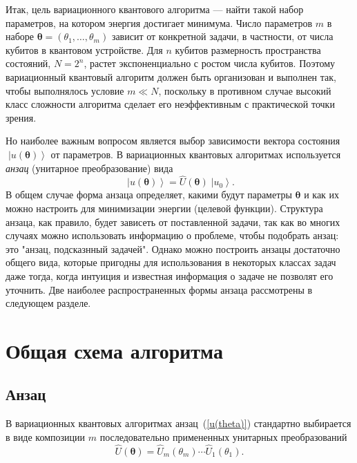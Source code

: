 \documentclass[a4paper]{report}
\newcommand{\ket}[1] {\!\!\;\ensuremath{\left|#1\right\rangle}}
\begin{document}
Итак, цель вариационного квантового алгоритма --- найти такой набор параметров, на котором энергия достигает минимума. Число параметров $m$ в наборе $\bm\theta=(\theta_1, \ldots,\theta_m)$ зависит от конкретной задачи, в частности, от числа кубитов в квантовом устройстве. Для $n$ кубитов размерность пространства состояний, $N=2^n$, растет экспоненциально с ростом числа кубитов. Поэтому вариационный квантовый алгоритм должен быть организован и выполнен так, чтобы выполнялось условие $m\ll N$, поскольку в противном случае высокий класс сложности алгоритма сделает его неэффективным с практической точки зрения.

Но наиболее важным вопросом является выбор зависимости вектора состояния $\ket{u(\bm\theta)}$ от параметров. В вариационных квантовых алгоритмах используется \textit{анзац} (унитарное преобразование) вида
\begin{equation}\label{u(theta)}
\ket{u(\bm\theta)}= \hat{U}(\bm\theta)\ket{u_0}.
\end{equation}
В общем случае форма анзаца определяет, какими будут параметры $\boldsymbol\theta$ и как их можно настроить для минимизации энергии (целевой функции). Структура анзаца, как правило, будет зависеть от поставленной задачи, так как во многих случаях можно использовать информацию о проблеме, чтобы подобрать анзац: это "анзац, подсказнный задачей". Однако можно построить анзацы достаточно общего вида, которые пригодны для использования в некоторых классах задач даже тогда, когда интуиция и известная информация о задаче не позволят его уточнить. Две наиболее распространенных формы анзаца рассмотрены в следующем разделе.





\section{Общая схема алгоритма}

\subsection{Анзац}

В вариационных квантовых алгоритмах анзац~(\ref{u(theta)}) стандартно выбирается в виде композиции $m$ последовательно примененных унитарных преобразований
\begin{equation}\label{Ansatz}
\hat{U}(\boldsymbol\theta)= \hat{U}_{m}(\theta_m)\cdots \hat{U}_{1}(\theta_1).
\end{equation}
\end{document}
